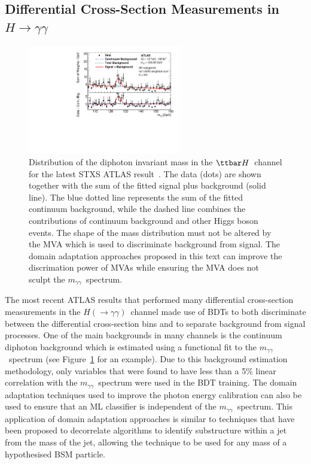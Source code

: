 \documentclass[letter, USenglish, 11pt, subfigure]{article}
\newcommand{\ttH}{\ensuremath{\ttbar H}}
\newcommand{\myy}{\ensuremath{m_{\gamma\gamma}}}
\newcommand{\hyy}{\ensuremath{H(\to\gamma\gamma)}}
\begin{document}
\subsection{Differential Cross-Section Measurements in $H\to\gamma\gamma$}
\begin{figure}[ht]
  \centering
  \includegraphics[width=0.6\textwidth]{figures/tth_myy.pdf}
  \caption{\label{fig:myy} Distribution of the diphoton invariant mass in the \ttH\ channel for the latest STXS ATLAS result~\cite{ATLAS_STXS}. The data (dots) are shown together with the sum of the fitted signal plus background (solid line). The blue dotted line represents the sum of the fitted continuum background, while the dashed line combines the contributions of continuum background and other Higgs boson events. The shape of the mass distribution must not be altered by the MVA which is used to discriminate background from signal. The domain adaptation approaches proposed in this text can improve the discrimation power of MVAs while ensuring the MVA does not sculpt the \myy\ spectrum.}
\end{figure}

The most recent ATLAS results that performed many differential cross-section measurements in the \hyy\ channel made use of BDTs to both discriminate between the differential cross-section bins and to separate background from signal processes. One of the main backgrounds in many channels is the continuum diphoton background which is estimated using a functional fit to the \myy\ spectrum (see Figure~\ref{fig:myy} for an example). Due to this background estimation methodology, only variables that were found to have less than a 5\% linear correlation with the \myy\ spectrum were used in the BDT training. The domain adaptation techniques used to improve the photon energy calibration can also be used to ensure that an ML classifier is independent of the \myy\ spectrum. This application of domain adaptation approaches is similar to techniques that have been proposed to decorrelate algorithms to identify substructure within a jet from the mass of the jet, allowing the technique to be used for any mass of a hypothesised BSM particle.
\end{document}
